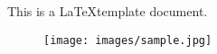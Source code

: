 This is a \LaTeX template document.\cite{small}

\begin{figure}
    \centering
    \texttt{[image: images/sample.jpg]}
\end{figure}
